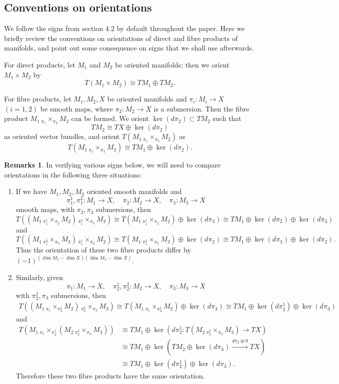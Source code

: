 \documentclass[10pt]{amsart}
\numberwithin{equation}{section}
\theoremstyle{plain}
\theoremstyle{definition}
\newtheorem{remarks}[theorem]{Remarks}
\theoremstyle{remark}
\numberwithin{equation}{section}
\newcommand{\fiberprod}[2]{\,_{#1}\!\!\times_{#2} }
\begin{document}
{\subsection{Conventions on orientations}
\label{Subsc: Ori}
We follow the signs from \cite{Irie2} section 4.2 by default throughout the paper.
Here we briefly review the conventions on orientations of direct and fibre products of manifolds, and point out some consequence on signs that we shall use afterwards.

For direct products, let $M_1$ and $M_2$ be oriented manifolds; then we orient $M_1\times M_2$ by \[ T(M_1\times M_2) \cong TM_1\oplus TM_2. \]

For fibre products, let $M_1,M_2, X$ be oriented manifolds and $\pi_i\colon M_i\to X$ $(i=1,2)$ be smooth maps, where $\pi_2\colon M_2\to X$ is a submersion. Then the fibre product $M_1\fiberprod{\pi_1}{\pi_2}M_2$ can be formed. 
We orient $\ker(d\pi_2)\subset TM_2$ such that 
\[
	TM_2\cong TX\oplus\ker (d\pi_2)
\]as oriented vector bundles,
and orient $T(M_1\fiberprod{\pi_1}{\pi_2}M_2)$ as
\[
	T(M_1\fiberprod{\pi_1}{\pi_2} M_2) \cong TM_1\oplus \ker(d\pi_2).
\]

\begin{remarks}\label{Rmk: Ori}
In verifying various signs below, we will need to compare orientations in the following three situations:	
\begin{enumerate}
	\item If we have $M_1,M_2,M_3$ oriented smooth manifolds and 
\[ \pi_1^1,\pi_1^2\colon M_1\to X, \quad \pi_2\colon M_2\to X, \quad \pi_3\colon M_3\to X\]
 smooth maps, with $\pi_2,\pi_3$ submersions, then
\[
	T((M_1\fiberprod{\pi^1_1}{\pi_2} M_2)\fiberprod{\pi^2_1}{\pi_3} M_3)\cong T(M_1\fiberprod{\pi_1^1}{\pi_2}M_2)\oplus\ker(d\pi_3)\cong TM_1\oplus \ker (d\pi_2)\oplus \ker (d\pi_3)
\]
and
\[
	T((M_1\fiberprod{\pi_1^2}{\pi_3}M_3)\fiberprod{\pi_1^1}{\pi_2}M_2)\cong T(M_1\fiberprod{\pi_1^2}{\pi_3}M_3)\oplus \ker(d\pi_2)\cong TM_1\oplus\ker(d\pi_3)\oplus\ker(d\pi_2).
\]
Thus the orientation of these two fibre products differ by $(-1)^{(\dim M_2-\dim X)(\dim M_3-\dim X)}$.

\item 
Similarly, given 
\[
	\pi_1\colon M_1\to X, \quad \pi_2^1,\pi_2^2\colon M_2\to X, \quad \pi_3\colon M_3\to X
\]
 with $\pi_2^1,\pi_3$ submersions, 
then \begin{align*}
 	T((M_1\fiberprod{\pi_1}{\pi_2^1}M_2)\fiberprod{\pi_2^2}{\pi_3} M_3)\cong T(M_1\fiberprod{\pi_1}{\pi_2^1}M_2)\oplus \ker (d\pi_3) \cong TM_1\oplus \ker (d\pi_2^1)\oplus \ker (d\pi_3)
 \end{align*}
 and 
 \begin{align*}
 	T(M_1\fiberprod{\pi_1}{\pi_2^1}(M_2\fiberprod{\pi_2^2}{\pi_3}M_3))&\cong TM_1 \oplus\ker(d\pi_2^1\colon T(M_2\fiberprod{\pi_2^2}{\pi_3}M_3)\to TX)\\
 	&\cong TM_1\oplus \ker (TM_2\oplus \ker (d\pi_3)\xrightarrow{d\pi_2\oplus 0} TX)\\
 	&\cong TM_1\oplus\ker(d\pi_2^1)\oplus \ker(d\pi_3).
 \end{align*}
 Therefore these two fibre products have the same orientation.
 

\end{enumerate}
\end{remarks}}
\end{document}
